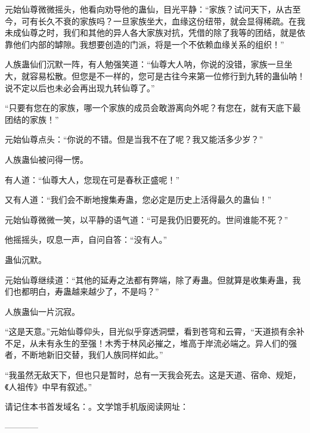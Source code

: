 \begin{this_body}
元始仙尊微微摇头，他看向劝导他的蛊仙，目光平静：“家族？试问天下，从古至今，可有长久不衰的家族吗？一旦家族坐大，血缘这份纽带，就会显得稀疏。在我未成仙尊之时，我们和其他的异人各大家族对抗，凭借的除了我等的团结，就是依靠他们内部的罅隙。我想要创造的门派，将是一个不依赖血缘关系的组织！”

人族蛊仙们沉默一阵，有人勉强笑道：“仙尊大人呐，你说的没错，家族一旦坐大，就容易松散。但您是不一样的，您可是古往今来第一位修行到九转的蛊仙呐！说不定以后也未必会再出现九转仙尊了。”

“只要有您在的家族，哪一个家族的成员会敢游离向外呢？有您在，就有天底下最团结的家族！”

元始仙尊点头：“你说的不错。但是当我不在了呢？我又能活多少岁？”

人族蛊仙被问得一愣。

有人道：“仙尊大人，您现在可是春秋正盛呢！”

又有人道：“我们会不断地搜集寿蛊，您必定是历史上活得最久的蛊仙！”

元始仙尊微微一笑，以平静的语气道：“可是我仍旧要死的。世间谁能不死？”

他摇摇头，叹息一声，自问自答：“没有人。”

蛊仙沉默。

元始仙尊继续道：“其他的延寿之法都有弊端，除了寿蛊。但就算是收集寿蛊，我们也都明白，寿蛊越来越少了，不是吗？”

人族蛊仙一片沉寂。

“这是天意。”元始仙尊仰头，目光似乎穿透洞壁，看到苍穹和云霄，“天道损有余补不足，从未有永生的至强！木秀于林风必摧之，堆高于岸流必端之。异人们的强者，不断地新旧交替，我们人族同样如此。”

“我虽然无敌天下，但也只是暂时，总有一天我会死去。这是天道、宿命、规矩，《人祖传》中早有叙述。”

请记住本书首发域名：。文学馆手机版阅读网址：

------------

\end{this_body}

